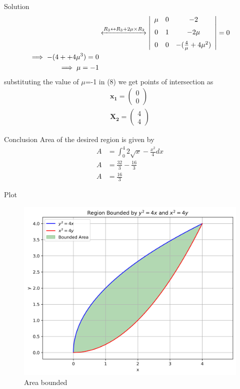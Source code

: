 \documentclass{beamer}
\numberwithin{equation}{section}
\theoremstyle{remark}
\newcommand{\myvec}[1]{\ensuremath{\begin{pmatrix}#1\end{pmatrix}}}
\let\vec\mathbf
\begin{document}
\begin{frame}{Solution}
    \begin{align}
&\xleftrightarrow{R_3 \leftrightarrow R_3 + 2\mu \times R_2} \left|
\begin{array}{ccc}
\mu & 0 & -2 \\[6pt]
0 & 1  & -2\mu \\[6pt]
0 & 0 & -(\frac{4}{\mu} +4 \mu ^2)
\end{array}
\right| =0\\
\implies -(4 + +4 \mu ^3)=0\\
\implies \mu=-1
\end{align}
substituting the value of $\mu$=-1 in (8) we get points of intersection as 
\begin{align}
    \vec{x_1}=\myvec{0\\0} \\
    \vec{X_2}=\myvec{4\\4}
\end{align}
\end{frame}
\begin{frame}{Conclusion}
Area of the desired region is given by
\begin{align}
A &= \int_{0}^{4}2\sqrt{x}-\frac{x^2}{4}dx\\
A &= \frac{32}{3}-\frac{16}{3}\\
A &= \frac{16}{3}
\end{align}
\end{frame}

\begin{frame}{Plot}
    \begin{figure}[h!]
    \centering
    \includegraphics[width=0.7\columnwidth]{figs/01.png}
    \caption{Area bounded}
    \label{fig:placeholder}
\end{figure}
\end{frame}
\end{document}

